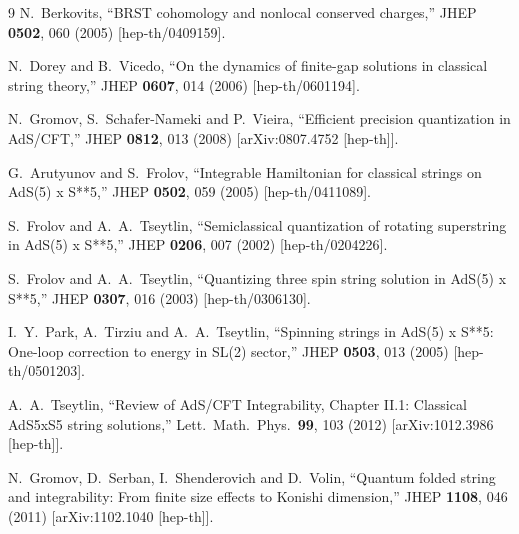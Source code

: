 \documentclass[a4paper,11pt]{article}
\numberwithin{equation}{section}
\begin{document}
\begin{thebibliography} {9}
  N.~Berkovits,
  ``BRST cohomology and nonlocal conserved charges,''
  JHEP {\bf 0502}, 060 (2005)
  [hep-th/0409159].

  N.~Dorey and B.~Vicedo,
  ``On the dynamics of finite-gap solutions in classical string theory,''
  JHEP {\bf 0607}, 014 (2006)
  [hep-th/0601194].

  N.~Gromov, S.~Schafer-Nameki and P.~Vieira,
  ``Efficient precision quantization in AdS/CFT,''
  JHEP {\bf 0812}, 013 (2008)
  [arXiv:0807.4752 [hep-th]].

  G.~Arutyunov and S.~Frolov,
  ``Integrable Hamiltonian for classical strings on AdS(5) x S**5,''
  JHEP {\bf 0502}, 059 (2005)
  [hep-th/0411089].

  S.~Frolov and A.~A.~Tseytlin,
  ``Semiclassical quantization of rotating superstring in AdS(5) x S**5,''
  JHEP {\bf 0206}, 007 (2002)
  [hep-th/0204226].

  S.~Frolov and A.~A.~Tseytlin,
  ``Quantizing three spin string solution in AdS(5) x S**5,''
  JHEP {\bf 0307}, 016 (2003)
  [hep-th/0306130].

  I.~Y.~Park, A.~Tirziu and A.~A.~Tseytlin,
  ``Spinning strings in AdS(5) x S**5: One-loop correction to energy in SL(2) sector,''
  JHEP {\bf 0503}, 013 (2005)
  [hep-th/0501203].

  A.~A.~Tseytlin,
  ``Review of AdS/CFT Integrability, Chapter II.1: Classical AdS5xS5 string solutions,''
  Lett.\ Math.\ Phys.\  {\bf 99}, 103 (2012)
  [arXiv:1012.3986 [hep-th]].

  N.~Gromov, D.~Serban, I.~Shenderovich and D.~Volin,
  ``Quantum folded string and integrability: From finite size effects to Konishi dimension,''
  JHEP {\bf 1108}, 046 (2011)
  [arXiv:1102.1040 [hep-th]].


\end{thebibliography}
\end{document}
